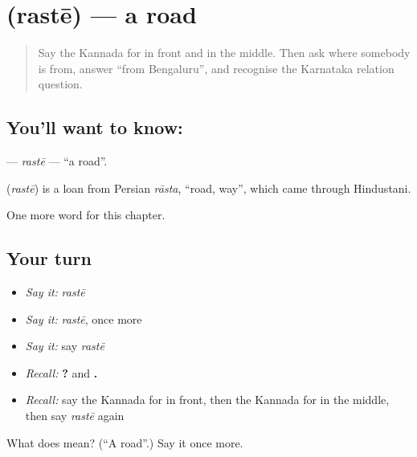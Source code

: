 \section[\texorpdfstring{\kn{ರಸ್ತೆ} (rastē)}{ರಸ್ತೆ (rastē)}]{ (rastē) — a road}

\label{lesson:KA-C108-raste}



\begin{quote}
Say the Kannada for in front and in the middle. Then ask where somebody is from, answer “from Bengaluru”, and recognise the Karnataka relation question.
\end{quote}

\subsection*{You'll want to know: }
\textbf{} — \emph{rastē} — \textquotedblleft{}a road\textquotedblright{}.

\begin{cousinweb}
\textbf{} (\emph{rastē}) is a loan from Persian \emph{rāsta}, \textquotedblleft{}road, way\textquotedblright{}, which came through Hindustani.
\end{cousinweb}

\begin{grammarlens}[title={What you've built}]
One more word for this chapter.
\end{grammarlens}

\subsection*{Your turn}
\begin{itemize}
\raggedright
  \item \emph{Say it:} \emph{rastē}
  \item \emph{Say it:} \emph{rastē}, once more
  \item \emph{Say it:} say \emph{rastē}
  \item \emph{Recall:} \textbf{  ?} and \textbf{  .}
  \item \emph{Recall:} say the Kannada for in front, then the Kannada for in the middle, then say \emph{rastē} again
\end{itemize}

\begin{tcolorbox}[breakable,colback=teal!4,colframe=teal!35!black,title={Before you move on}]
What does  mean? (\textquotedblleft{}A road\textquotedblright{}.) Say it once more.
\end{tcolorbox}

